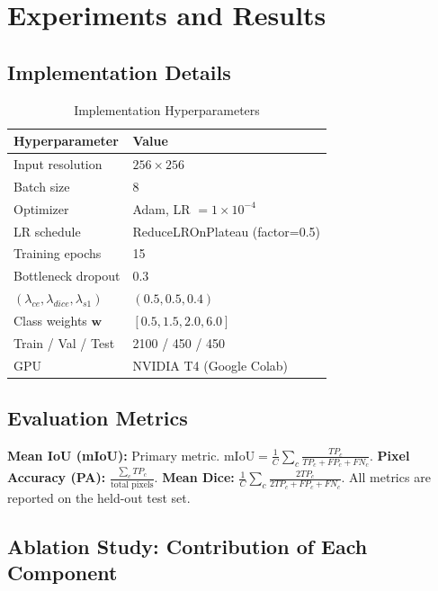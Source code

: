 \section{Experiments and Results}
\label{sec:experiments}

\subsection{Implementation Details}

\begin{table}[h]
\centering
\caption{Implementation Hyperparameters}
\label{tab:impl}
\begin{tabular}{ll}
\toprule
\textbf{Hyperparameter} & \textbf{Value} \\
\midrule
Input resolution            & $256 \times 256$ \\
Batch size                  & 8 \\
Optimizer                   & Adam, LR $= 1\times10^{-4}$ \\
LR schedule                 & ReduceLROnPlateau (factor=0.5) \\
Training epochs             & 15 \\
Bottleneck dropout          & 0.3 \\
$(\lambda_{ce}, \lambda_{dice}, \lambda_{s1})$ & $(0.5, 0.5, 0.4)$ \\
Class weights $\mathbf{w}$  & $[0.5, 1.5, 2.0, 6.0]$ \\
Train / Val / Test          & 2100 / 450 / 450 \\
GPU                         & NVIDIA T4 (Google Colab) \\
\bottomrule
\end{tabular}
\end{table}

\subsection{Evaluation Metrics}

\textbf{Mean IoU (mIoU):} Primary metric.
$\text{mIoU} = \frac{1}{C}\sum_c \frac{TP_c}{TP_c+FP_c+FN_c}$.
\textbf{Pixel Accuracy (PA):}
$\frac{\sum_c TP_c}{\text{total pixels}}$.
\textbf{Mean Dice:}
$\frac{1}{C}\sum_c \frac{2TP_c}{2TP_c+FP_c+FN_c}$.
All metrics are reported on the held-out test set.

\subsection{Ablation Study: Contribution of Each Component}


